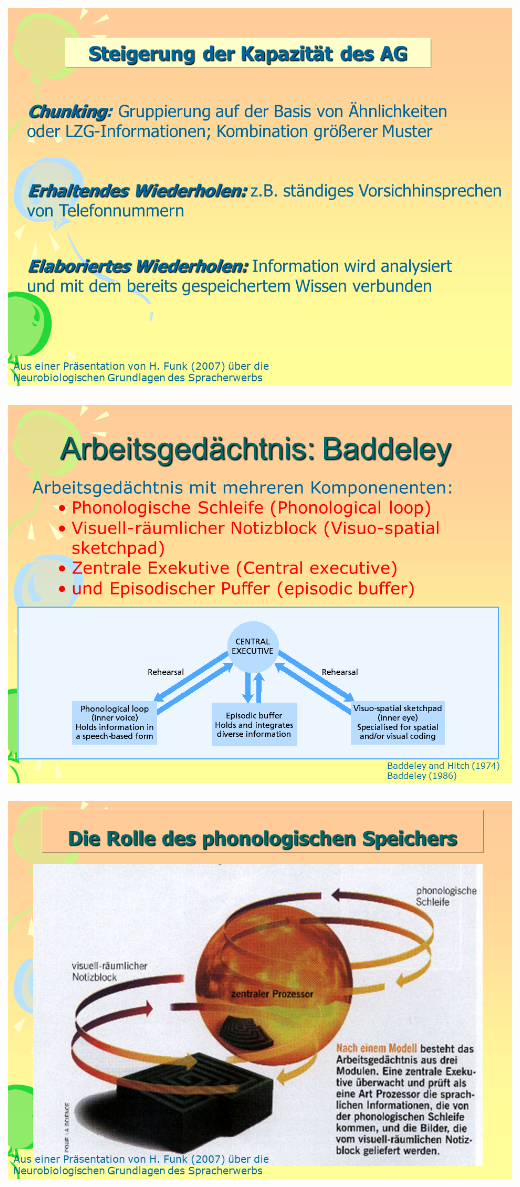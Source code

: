 \documentclass[
  letterpaper,
]{scrbook}
\begin{document}
\includegraphics[width=1\textwidth,height=\textheight]{./pictures/neuro/Diapozitiv41.PNG}

\includegraphics[width=1\textwidth,height=\textheight]{./pictures/neuro/Diapozitiv42.PNG}

\includegraphics[width=1\textwidth,height=\textheight]{./pictures/neuro/Diapozitiv43.PNG}
\end{document}
